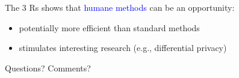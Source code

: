 \documentclass[aspectratio=169]{beamer}
\begin{document}
\begin{frame}

The 3 Rs shows that \textcolor{blue}{humane methods} can be an opportunity:
\pause
\begin{itemize}
\item potentially more efficient than standard methods
\pause
\item stimulates interesting research (e.g., differential privacy)
\end{itemize}

\end{frame}
\begin{frame}

Questions?  Comments?

\end{frame}
\end{document}

